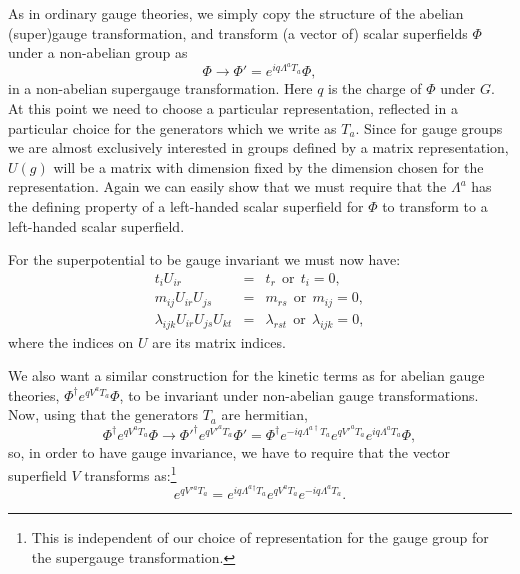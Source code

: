 \documentclass[notes.tex]{subfiles}
\begin{document}
As in ordinary gauge theories, we simply copy the structure of the abelian (super)gauge transformation, and transform (a vector of) scalar superfields $\Phi$ under a non-abelian group as
\[\Phi \to \Phi'=e^{iq \Lambda^aT_a}\Phi,\]
in a non-abelian supergauge transformation. Here $q$ is the charge of $\Phi$ under $G$. At this point we need to choose a particular representation, reflected in a particular choice for the generators which we write as $T_a$. Since for gauge groups we are almost exclusively interested in groups defined by a matrix representation, $U(g)$ will be a matrix with dimension fixed by the dimension chosen for the representation. Again we can easily show that we must require that the $\Lambda^a$ has the defining property of a left-handed scalar superfield for $\Phi$ to transform to a left-handed scalar superfield.

For the superpotential to be gauge invariant we must now have:
\begin{eqnarray}
t_iU_{ir} &=& t_r ~~\text{or}~~ t_i = 0, \\
m_{ij}U_{ir} U_{js} &=& m_{rs} ~~\text{or}~~m_{ij}=0, \\
 \lambda_{ijk}U_{ir} U_{js}U_{kt}&=& \lambda_{rst} ~~\text{or}~~\lambda_{ijk}=0,
\end{eqnarray}
where the indices on $U$ are its matrix indices. 

We also want a similar construction for the kinetic terms as for abelian gauge theories, $\Phi^\dagger e^{qV^aT_a}\Phi$, to be invariant under non-abelian gauge transformations. Now, using that the generators $T_a$ are hermitian, 
\[\Phi^\dagger e^{qV^aT_a}\Phi \to \Phi'^\dagger e^{qV'^aT_a}\Phi' = \Phi^\dagger e^{-iq\Lambda^{a\dagger} T_a} e^{qV'^aT_a}e^{iq\Lambda^aT_a}\Phi,\]
so, in order to have gauge invariance, we have to require that the vector superfield $V$ transforms as:\footnote{This is independent of our choice of representation for the gauge group for the supergauge transformation.}
\begin{equation}
e^{qV'{}^aT_a} = e^{iq\Lambda^a{}^\dagger T_a}e^{qV^aT_a} e^{-iq\Lambda^a T_a}.
\end{equation}
\end{document}
